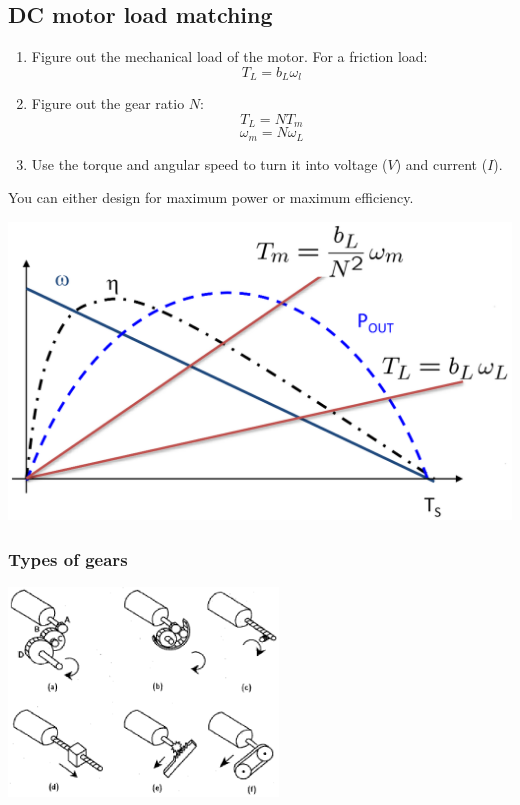 \documentclass[11pt]{article}
\begin{document}
 \newpage
\subsection{DC motor load matching}
\label{sec:org149abdb}
\begin{enumerate}
\item Figure out the mechanical load of the motor. For a friction load:
\[T_L = b_L \omega_l\]
\item Figure out the gear ratio \(N\):
\[T_L = NT_m\]
\[\omega_m = N \omega_L\]
\item Use the torque and angular speed to turn it into voltage (\(V\)) and current (\(I\)).
\end{enumerate}

You can either design for maximum power or maximum efficiency.
\begin{center}
\includegraphics[width=.9\linewidth]{./images/dc-motor-load-matching-graph.png}
\end{center}
\subsubsection{Types of gears}
\label{sec:org72fa071}
\begin{center}
\includegraphics[height=15em]{./images/dc-motor-types-of-gears.png}
\end{center}
\end{document}
